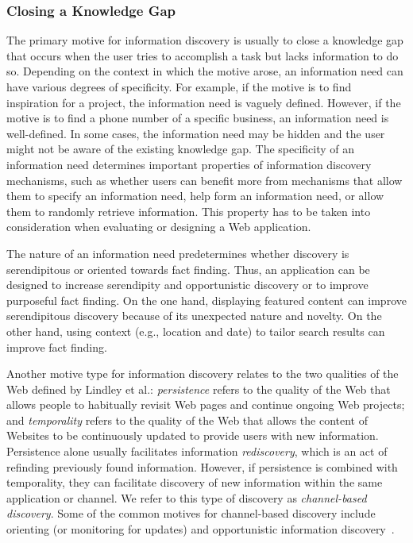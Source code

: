 \documentclass{sigchi}
\begin{document}
{{{\subsubsection{Closing a Knowledge Gap}
The primary motive for information discovery is usually to close a knowledge gap that occurs when the user tries to accomplish a task but lacks information to do so. 
Depending on the context in which the motive arose, an information need can have various degrees of specificity. For example, if the motive is to find inspiration for a project, the information need is vaguely defined. However, if the motive is to find a phone number of a specific business, an information need is well-defined. In some cases, the information need may be hidden and the user might not be aware of the existing knowledge gap. The specificity of an information need determines important properties of information discovery mechanisms, such as whether users can benefit more from mechanisms that allow them to specify an information need, help form an information need, or allow them to randomly retrieve information. This property has to be taken into consideration when evaluating or designing a Web application. 

The nature of an information need predetermines whether discovery is 
serendipitous or oriented towards fact finding. Thus, 
an application can be designed to increase serendipity and opportunistic discovery or to improve purposeful fact finding. On the one hand, displaying featured content can improve serendipitous discovery because of its unexpected nature and novelty. On the other hand, using context (e.g., location and date) to tailor search results can improve fact finding. 

Another motive type for information discovery relates to the two qualities of the Web defined by Lindley et al.\cite{lindley2012s}: \textit{persistence} refers to the quality of the Web that allows people to habitually revisit Web pages and continue ongoing Web projects; and \textit{temporality} refers to the quality of the Web that allows the content of Websites to be continuously updated to provide users with new information. Persistence alone usually facilitates information \textit{rediscovery}, which is an act of refinding previously found information. However, if persistence is combined with temporality, they can facilitate discovery of new information within the same application or channel. We refer to this type of discovery as \textit{channel-based discovery}. Some of the common motives for channel-based discovery include orienting (or monitoring for updates) and opportunistic information discovery~\cite{lindley2012s}.          

}}}
\end{document}
